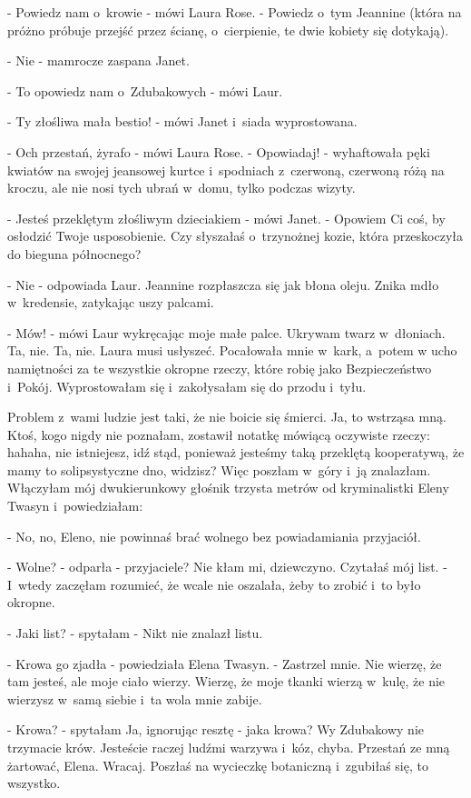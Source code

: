 \documentclass[oneside,polish,12pt,sfheadings]{mwbk}
\begin{document}
- Powiedz nam o~krowie - mówi Laura Rose. - Powiedz o~tym Jeannine
(która na próżno próbuje przejść przez ścianę, o~cierpienie, te dwie
kobiety się dotykają).

- Nie - mamrocze zaspana Janet.

- To opowiedz nam o~Zdubakowych - mówi Laur.

- Ty złośliwa mała bestio! - mówi Janet i~siada wyprostowana.

- Och przestań, żyrafo - mówi Laura Rose. - Opowiadaj! - wyhaftowała
pęki kwiatów na swojej jeansowej kurtce i~spodniach z~czerwoną, czerwoną
różą na kroczu, ale nie nosi tych ubrań w~domu, tylko podczas wizyty.

- Jesteś przeklętym złośliwym dzieciakiem - mówi Janet. - Opowiem
Ci coś, by osłodzić Twoje usposobienie. Czy słyszałaś o~trzynożnej
kozie, która przeskoczyła do bieguna północnego?

- Nie - odpowiada Laur. Jeannine rozpłaszcza się jak błona oleju.
Znika mdło w~kredensie, zatykając uszy palcami.

- Mów! - mówi Laur wykręcając moje małe palce. Ukrywam twarz w~dłoniach.
Ta, nie. Ta, nie. Laura musi usłyszeć. Pocałowała mnie w~kark, a~potem
w ucho namiętności za te wszystkie okropne rzeczy, które robię jako
Bezpieczeństwo i~Pokój. Wyprostowałam się i~zakołysałam się do przodu i~tyłu.

Problem z~wami ludzie jest taki, że nie boicie się śmierci. Ja, to
wstrząsa mną. Ktoś, kogo nigdy nie poznałam, zostawił notatkę mówiącą
oczywiste rzeczy: hahaha, nie istniejesz, idź stąd, ponieważ jesteśmy
taką przeklętą kooperatywą, że mamy to solipsystyczne dno, widzisz?
Więc poszłam w~góry i~ją znalazłam. Włączyłam mój dwukierunkowy głośnik
trzysta metrów od kryminalistki Eleny Twasyn i~powiedziałam: 

- No, no, Eleno, nie powinnaś brać wolnego bez powiadamiania przyjaciół.

- Wolne? - odparła - przyjaciele? Nie kłam mi, dziewczyno. Czytałaś
mój list. - I~wtedy zaczęłam rozumieć, że wcale nie oszalała, żeby
to zrobić i~to było okropne. 

- Jaki list? - spytałam - Nikt nie znalazł listu.

- Krowa go zjadła - powiedziała Elena Twasyn. - Zastrzel mnie. Nie
wierzę, że tam jesteś, ale moje ciało wierzy. Wierzę, że moje tkanki
wierzą w~kulę, że nie wierzysz w~samą siebie i~ta wola mnie zabije.

- Krowa? - spytałam Ja, ignorując resztę - jaka krowa? Wy Zdubakowy
nie trzymacie krów. Jesteście raczej ludźmi warzywa i~kóz, chyba. Przestań ze mną żartować,
Elena. Wracaj. Poszłaś na wycieczkę botaniczną i~zgubiłaś się, to
wszystko.
\end{document}
